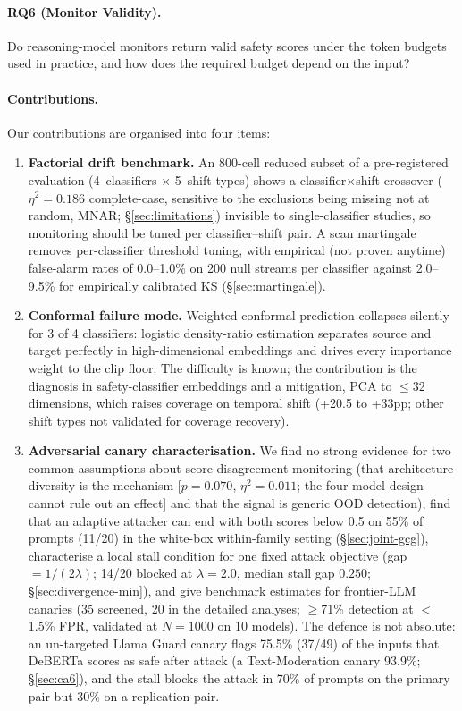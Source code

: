 \documentclass{article}
\begin{document}
\paragraph{RQ6 (Monitor Validity).} Do reasoning-model monitors return valid safety scores under the token budgets used in practice, and how does the required budget depend on the input?

\paragraph{Contributions.} Our contributions are organised into four items:

\begin{enumerate}
\item \textbf{Factorial drift benchmark.} An 800-cell reduced subset of a pre-registered evaluation (4~classifiers $\times$ 5~shift types) shows a classifier$\times$shift crossover ($\eta^2 = 0.186$ complete-case, sensitive to the exclusions being missing not at random, MNAR; \S\ref{sec:limitations}) invisible to single-classifier studies, so monitoring should be tuned per classifier--shift pair. A scan martingale removes per-classifier threshold tuning, with empirical (not proven anytime) false-alarm rates of 0.0--1.0\% on 200 null streams per classifier against 2.0--9.5\% for empirically calibrated KS (\S\ref{sec:martingale}).

\item \textbf{Conformal failure mode.} Weighted conformal prediction collapses silently for 3 of 4 classifiers: logistic density-ratio estimation separates source and target perfectly in high-dimensional embeddings and drives every importance weight to the clip floor. The difficulty is known; the contribution is the diagnosis in safety-classifier embeddings and a mitigation, PCA to $\leq$32 dimensions, which raises coverage on temporal shift (+20.5 to +33pp; other shift types not validated for coverage recovery).

\item \textbf{Adversarial canary characterisation.} We find no strong evidence for two common assumptions about score-disagreement monitoring (that architecture diversity is the mechanism [$p{=}0.070$, $\eta^2{=}0.011$; the four-model design cannot rule out an effect] and that the signal is generic OOD detection), find that an adaptive attacker can end with both scores below 0.5 on 55\% of prompts (11/20) in the white-box within-family setting (\S\ref{sec:joint-gcg}), characterise a local stall condition for one fixed attack objective (gap $= 1/(2\lambda)$; 14/20 blocked at $\lambda{=}2.0$, median stall gap $0.250$; \S\ref{sec:divergence-min}), and give benchmark estimates for frontier-LLM canaries (35 screened, 20 in the detailed analyses; $\geq$71\% detection at $<$1.5\% FPR, validated at $N{=}1000$ on 10 models). The defence is not absolute: an un-targeted Llama Guard canary flags 75.5\% (37/49) of the inputs that DeBERTa scores as safe after attack (a Text-Moderation canary 93.9\%; \S\ref{sec:ca6}), and the stall blocks the attack in 70\% of prompts on the primary pair but 30\% on a replication pair.


\end{enumerate}
\end{document}
